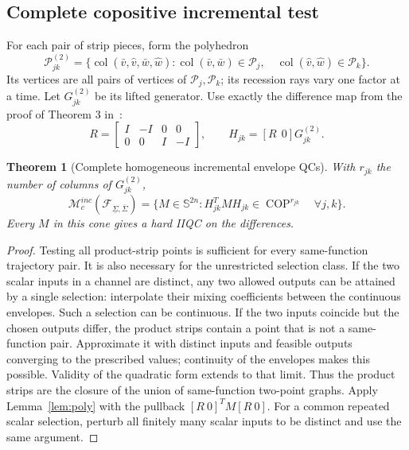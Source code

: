 \documentclass[10pt,a4paper]{article}
\newtheorem{theorem}{Theorem}
\theoremstyle{definition}
\theoremstyle{remark}
\newcommand{\Ss}{\mathbb S}
\newcommand{\COP}{\operatorname{COP}}
\newcommand{\col}{\operatorname{col}}
\newcommand{\mc}{\mathcal M_c}
\newcommand{\Fenv}{\mathcal F_{\underline\Sigma,\overline\Sigma}}
\begin{document}
\subsection{Complete copositive incremental test}
For each pair of strip pieces, form the polyhedron
\[
 \mathcal P_{jk}^{(2)}=
 \{\col(\bar v,\hat v,\bar w,\hat w):
 \col(\bar v,\bar w)\in\mathcal P_j,\quad
 \col(\hat v,\hat w)\in\mathcal P_k\}.
\]
Its vertices are all pairs of vertices of $\mathcal P_j,\mathcal P_k$; its recession rays vary one factor at a time. Let $G_{jk}^{(2)}$ be its lifted generator. Use exactly the difference map from the proof of Theorem 3 in~\cite{relu}:
\begin{equation}\label{eq:R}
 R=\begin{bmatrix}I&-I&0&0\\0&0&I&-I\end{bmatrix},\qquad
 H_{jk}=[R\ \ 0]G_{jk}^{(2)}.
\end{equation}
\begin{theorem}[Complete homogeneous incremental envelope QCs]\label{thm:envinc}
With $r_{jk}$ the number of columns of $G_{jk}^{(2)}$,
\begin{equation}\label{eq:env-inc-complete}
 \boxed{\mc^{inc}(\Fenv)=
 \{M\in\Ss^{2n}:H_{jk}^TMH_{jk}\in\COP^{r_{jk}}\quad\forall j,k\}.}
\end{equation}
Every $M$ in this cone gives a hard IIQC on the differences.
\end{theorem}
\begin{proof}
Testing all product-strip points is sufficient for every same-function trajectory pair. It is also necessary for the unrestricted selection class. If the two scalar inputs in a channel are distinct, any two allowed outputs can be attained by a single selection: interpolate their mixing coefficients between the continuous envelopes. Such a selection can be continuous. If the two inputs coincide but the chosen outputs differ, the product strips contain a point that is not a same-function pair. Approximate it with distinct inputs and feasible outputs converging to the prescribed values; continuity of the envelopes makes this possible. Validity of the quadratic form extends to that limit. Thus the product strips are the closure of the union of same-function two-point graphs. Apply Lemma~\ref{lem:poly} with the pullback $[R\ 0]^TM[R\ 0]$. For a common repeated scalar selection, perturb all finitely many scalar inputs to be distinct and use the same argument.
\end{proof}
\end{document}

